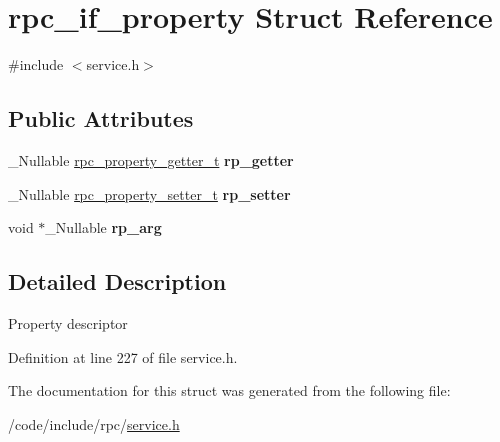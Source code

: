 \hypertarget{structrpc__if__property}{}\section{rpc\+\_\+if\+\_\+property Struct Reference}
\label{structrpc__if__property}


{\ttfamily \#include $<$service.\+h$>$}

\subsection*{Public Attributes}
\begin{DoxyCompactItemize}
\item 
\+\_\+\+Nullable \hyperlink{service_8h_ab438f0c33f3f3876f1c9a23d62134f16}{rpc\+\_\+property\+\_\+getter\+\_\+t} {\bfseries rp\+\_\+getter}\hypertarget{structrpc__if__property_a2b294c7fed3665f1a58020040ec13aee}{}\label{structrpc__if__property_a2b294c7fed3665f1a58020040ec13aee}

\item 
\+\_\+\+Nullable \hyperlink{service_8h_aa8b38d8ab3bafe79a96edaebafe13b8d}{rpc\+\_\+property\+\_\+setter\+\_\+t} {\bfseries rp\+\_\+setter}\hypertarget{structrpc__if__property_a02e1f9e6e5680714278ed6dd67987d67}{}\label{structrpc__if__property_a02e1f9e6e5680714278ed6dd67987d67}

\item 
void $\ast$\+\_\+\+Nullable {\bfseries rp\+\_\+arg}\hypertarget{structrpc__if__property_a81d2953a7a4bdff1775330c29992546b}{}\label{structrpc__if__property_a81d2953a7a4bdff1775330c29992546b}

\end{DoxyCompactItemize}


\subsection{Detailed Description}
Property descriptor 

Definition at line 227 of file service.\+h.



The documentation for this struct was generated from the following file\+:\begin{DoxyCompactItemize}
\item 
/code/include/rpc/\hyperlink{service_8h}{service.\+h}\end{DoxyCompactItemize}
